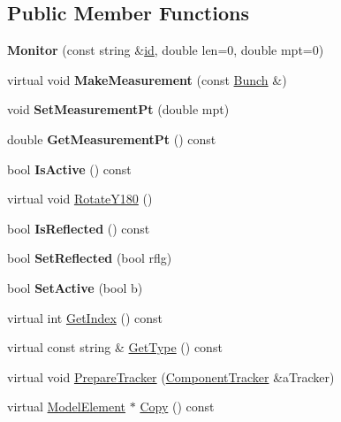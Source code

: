 \subsection*{Public Member Functions}
\begin{DoxyCompactItemize}
\item 
\mbox{\label{classMonitor_ab6b1056e847682aaa2fcccbe2c2da118}} 
{\bfseries Monitor} (const string \&\hyperlink{classModelElement_aada171ead2085c75b592cf07d91bc5c2}{id}, double len=0, double mpt=0)
\item 
\mbox{\label{classMonitor_a897cdb3d64fa8b63299e69674af54f90}} 
virtual void {\bfseries Make\+Measurement} (const \hyperlink{classBunch}{Bunch} \&)
\item 
\mbox{\label{classMonitor_a3e0fbeb41304651a275d804cf58fa972}} 
void {\bfseries Set\+Measurement\+Pt} (double mpt)
\item 
\mbox{\label{classMonitor_a5a2472da4c7b0dad9dc41c9412323f75}} 
double {\bfseries Get\+Measurement\+Pt} () const
\item 
\mbox{\label{classMonitor_a35f497be8c4c054b3f618315be69361d}} 
bool {\bfseries Is\+Active} () const
\item 
virtual void \hyperlink{classMonitor_ad4af2f46ca124bf0c958eca70a2c2769}{Rotate\+Y180} ()
\item 
\mbox{\label{classMonitor_afb06f23d1f3157be6ad39fcd9f37c203}} 
bool {\bfseries Is\+Reflected} () const
\item 
\mbox{\label{classMonitor_ade50b2f5494470571f99a8f64ac53559}} 
bool {\bfseries Set\+Reflected} (bool rflg)
\item 
\mbox{\label{classMonitor_a635cfa9f8db51282548e3617dd215125}} 
bool {\bfseries Set\+Active} (bool b)
\item 
virtual int \hyperlink{classMonitor_a38297eb50d06dd56201f2b48d92aa789}{Get\+Index} () const
\item 
virtual const string \& \hyperlink{classMonitor_a8408f173bef0f0c0dd89b6624c84f66b}{Get\+Type} () const
\item 
virtual void \hyperlink{classMonitor_a8d5e3ab0d68f89a51aabdcde2b01977a}{Prepare\+Tracker} (\hyperlink{classComponentTracker}{Component\+Tracker} \&a\+Tracker)
\item 
virtual \hyperlink{classModelElement}{Model\+Element} $\ast$ \hyperlink{classMonitor_a66d7932308a7206eeefc552bd3f5b1f6}{Copy} () const
\end{DoxyCompactItemize}
